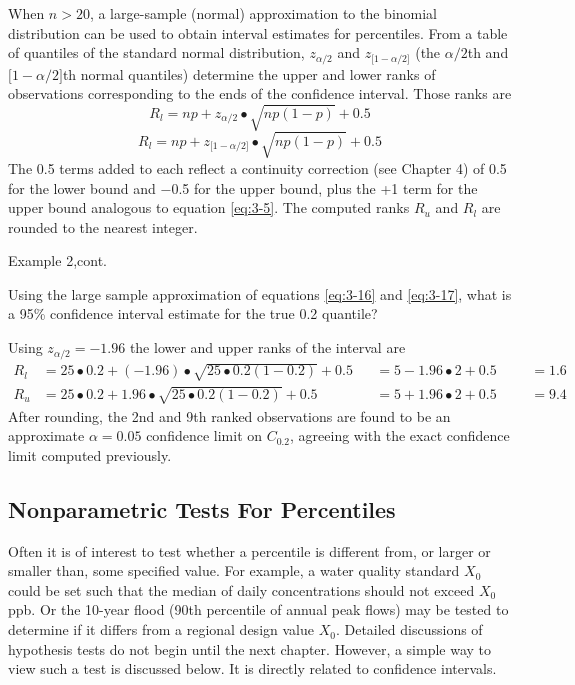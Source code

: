 \documentclass[]{book}
\begin{document}
When \(n > 20\), a large-sample (normal) approximation to the binomial distribution can be used to obtain interval estimates for percentiles. From a table of quantiles of the standard normal distribution, \(z_{\alpha / 2}\) and \(z_{\lbrack 1 - \alpha / 2 \rbrack}\) (the \(\alpha / 2\)th and \(\lbrack 1 − \alpha / 2 \rbrack\)th normal quantiles) determine the upper and lower ranks of observations corresponding to the ends of the confidence interval. Those ranks are
\begin{equation}
R_{l} = np + z_{\alpha / 2} \bullet \sqrt{np(1 - p)} + 0.5
\label{eq:3-16}
\end{equation}
\begin{equation}
R_{l} = np + z_{\lbrack 1 - \alpha / 2 \rbrack} \bullet \sqrt{np(1 - p)} + 0.5
\label{eq:3-17}
\end{equation}
The 0.5 terms added to each reflect a continuity correction (see Chapter 4) of 0.5 for the lower bound and −0.5 for the upper bound, plus the +1 term for the upper bound analogous to equation \eqref{eq:3-5}. The computed ranks \(R_{u}\) and \(R_{l}\) are rounded to the nearest integer.

Example 2,cont.

Using the large sample approximation of equations \eqref{eq:3-16} and \eqref{eq:3-17}, what is a 95\% confidence interval estimate for the true 0.2 quantile?

Using \(z_{\alpha / 2} = - 1.96\) the lower and upper ranks of the interval are
\begin{equation}
\begin{aligned}
R_{l} &= 25 \bullet 0.2 + (-1.96) \bullet \sqrt{25 \bullet 0.2(1 - 0.2)} + 0.5 &&= 5 - 1.96 \bullet 2 + 0.5 &&&= 1.6 \\
R_{u} &= 25 \bullet 0.2 + 1.96 \bullet \sqrt{25 \bullet 0.2(1 - 0.2)} + 0.5 &&= 5 + 1.96 \bullet 2 + 0.5 &&&= 9.4
\end{aligned}
\end{equation}
After rounding, the 2nd and 9th ranked observations are found to be an approximate \(\alpha = 0.05\) confidence limit on \(C_{0.2}\), agreeing with the exact confidence limit computed previously.

\hypertarget{ch3-7-2}{%
\subsection{Nonparametric Tests For Percentiles}\label{ch3-7-2}}

Often it is of interest to test whether a percentile is different from, or larger or smaller than, some specified value. For example, a water quality standard \(X_{0}\) could be set such that the median of daily concentrations should not exceed \(X_{0}\) ppb. Or the 10-year flood (90th percentile of annual peak flows) may be tested to determine if it differs from a regional design value \(X_{0}\). Detailed discussions of hypothesis tests do not begin until the next chapter. However, a simple way to view such a test is discussed below. It is directly related to confidence intervals.
\end{document}
